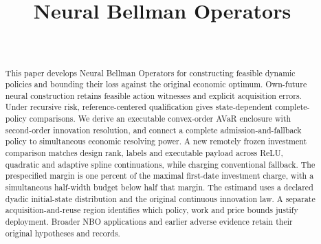 \documentclass[ecta,nameyear,draft]{econsocart}
\begin{document}
\begin{frontmatter}
\title{Neural Bellman Operators}
\begin{aug}
\author[id=au1,addressref={add1}]{~}
\address[id=add1]{Peking University}
\end{aug}
\begin{abstract}
This paper develops Neural Bellman Operators for constructing feasible dynamic policies and bounding their loss against the original economic optimum. Own-future neural construction retains feasible action witnesses and explicit acquisition errors. Under recursive risk, reference-centered qualification gives state-dependent complete-policy comparisons. We derive an executable convex-order AVaR enclosure with second-order innovation resolution, and connect a complete admission-and-fallback policy to simultaneous economic resolving power. A new remotely frozen investment comparison matches design rank, labels and executable payload across ReLU, quadratic and adaptive spline continuations, while charging conventional fallback. The prespecified margin is one percent of the maximal first-date investment charge, with a simultaneous half-width budget below half that margin. The estimand uses a declared dyadic initial-state distribution and the original continuous innovation law. A separate acquisition-and-reuse region identifies which policy, work and price bounds justify deployment. Broader NBO applications and earlier adverse evidence retain their original hypotheses and records.
\end{abstract}
\begin{keyword}
\end{keyword}
\end{frontmatter}













\end{document}
